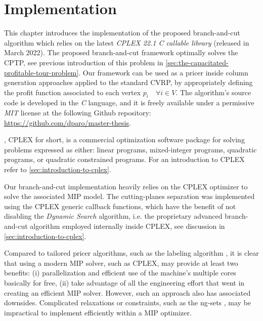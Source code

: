\chapter{Implementation}
\label{sec:implementation-chapter}

This chapter introduces the implementation of the proposed
branch-and-cut algorithm which relies on the
latest \textit{CPLEX 22.1 C callable library} (released in March 2022).
The proposed branch-and-cut framework optimally solves the CPTP,
see previous introduction of this problem in \cref{sec:the-capacitated-profitable-tour-problem}.
Our framework can be used as a pricer
inside column generation approaches applied to the standard CVRP,
by appropriately defining the profit function associated to each vertex $p_i \quad \forall i \in V$.
The algorithm's source code is developed in the \textit{C} language,
and it is freely available under a permissive \textit{MIT} license
at the following Github repository: \url{https://github.com/dparo/master-thesis}.

\medskip

,
CPLEX for short,
is a commercial optimization software package for solving problems expressed as either:
linear programs, mixed-integer programs, quadratic programs, or quadratic constrained programs.
For an introduction to CPLEX refer to \cref{sec:introduction-to-cplex}.

Our branch-and-cut implementation heavily relies on the CPLEX optimizer
to solve the associated MIP model.
The cutting-planes separation was implemented using the CPLEX generic callback functions,
which have the benefit of not disabling the \textit{Dynamic Search} algorithm,
i.e. the proprietary advanced branch-and-cut algorithm employed internally inside CPLEX,
see discussion in \cref{sec:introduction-to-cplex}.

Compared to tailored pricer algorithms, such as the labeling algorithm \parencite{desrochers1992, feillet2004},
it is clear that using a modern MIP solver, such as CPLEX,
may provide at least two benefits:
(i) parallelization and efficient use of the machine's multiple cores basically for free,
(ii) take advantage of all the engineering effort that went in creating an efficient MIP solver.
However, such an approach also has associated downsides.
Complicated relaxations or constraints,
such as the ng-sets \parencite{baldacci2011},
may be impractical to implement efficiently within a MIP optimizer.

